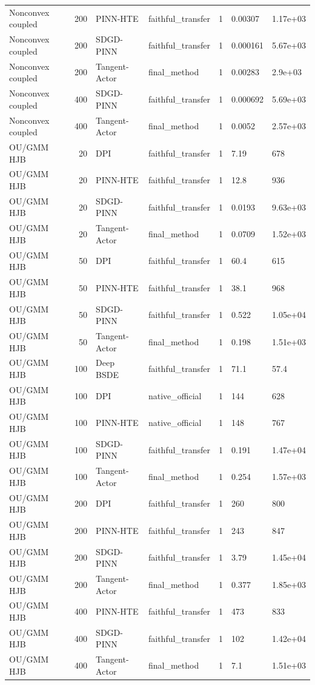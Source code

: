 \begin{tabular}{lrllrll}
Nonconvex coupled & 200 & PINN-HTE & faithful\_transfer & 1 & 0.00307 & 1.17e+03 \\
Nonconvex coupled & 200 & SDGD-PINN & faithful\_transfer & 1 & 0.000161 & 5.67e+03 \\
Nonconvex coupled & 200 & Tangent-Actor & final\_method & 1 & 0.00283 & 2.9e+03 \\
Nonconvex coupled & 400 & SDGD-PINN & faithful\_transfer & 1 & 0.000692 & 5.69e+03 \\
Nonconvex coupled & 400 & Tangent-Actor & final\_method & 1 & 0.0052 & 2.57e+03 \\
OU/GMM HJB & 20 & DPI & faithful\_transfer & 1 & 7.19 & 678 \\
OU/GMM HJB & 20 & PINN-HTE & faithful\_transfer & 1 & 12.8 & 936 \\
OU/GMM HJB & 20 & SDGD-PINN & faithful\_transfer & 1 & 0.0193 & 9.63e+03 \\
OU/GMM HJB & 20 & Tangent-Actor & final\_method & 1 & 0.0709 & 1.52e+03 \\
OU/GMM HJB & 50 & DPI & faithful\_transfer & 1 & 60.4 & 615 \\
OU/GMM HJB & 50 & PINN-HTE & faithful\_transfer & 1 & 38.1 & 968 \\
OU/GMM HJB & 50 & SDGD-PINN & faithful\_transfer & 1 & 0.522 & 1.05e+04 \\
OU/GMM HJB & 50 & Tangent-Actor & final\_method & 1 & 0.198 & 1.51e+03 \\
OU/GMM HJB & 100 & Deep BSDE & faithful\_transfer & 1 & 71.1 & 57.4 \\
OU/GMM HJB & 100 & DPI & native\_official & 1 & 144 & 628 \\
OU/GMM HJB & 100 & PINN-HTE & native\_official & 1 & 148 & 767 \\
OU/GMM HJB & 100 & SDGD-PINN & faithful\_transfer & 1 & 0.191 & 1.47e+04 \\
OU/GMM HJB & 100 & Tangent-Actor & final\_method & 1 & 0.254 & 1.57e+03 \\
OU/GMM HJB & 200 & DPI & faithful\_transfer & 1 & 260 & 800 \\
OU/GMM HJB & 200 & PINN-HTE & faithful\_transfer & 1 & 243 & 847 \\
OU/GMM HJB & 200 & SDGD-PINN & faithful\_transfer & 1 & 3.79 & 1.45e+04 \\
OU/GMM HJB & 200 & Tangent-Actor & final\_method & 1 & 0.377 & 1.85e+03 \\
OU/GMM HJB & 400 & PINN-HTE & faithful\_transfer & 1 & 473 & 833 \\
OU/GMM HJB & 400 & SDGD-PINN & faithful\_transfer & 1 & 102 & 1.42e+04 \\
OU/GMM HJB & 400 & Tangent-Actor & final\_method & 1 & 7.1 & 1.51e+03 \\
\bottomrule
\end{tabular}
